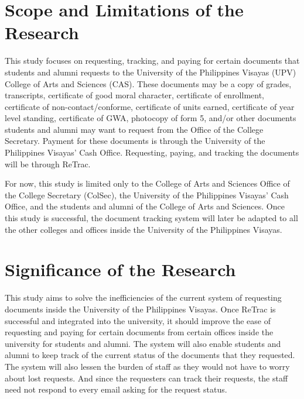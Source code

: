 \section{Scope and Limitations of the Research}
\label{sec:scopelimitations}

This study focuses on requesting, tracking, and paying for certain documents that students and alumni requests to the University of the Philippines Visayas (UPV) College of Arts and Sciences (CAS). These documents may be a copy of grades, transcripts, certificate of good moral character, certificate of enrollment, certificate of non-contact/conforme, certificate of units earned, certificate of year level standing, certificate of GWA, photocopy of form 5, and/or other documents students and alumni may want to request from the Office of the College Secretary. Payment for these documents is through the University of the Philippines Visayas’ Cash Office. Requesting, paying, and tracking the documents will be through ReTrac.

For now, this study is limited only to the College of Arts and Sciences Office of the College Secretary (ColSec), the University of the Philippines Visayas’ Cash Office, and the students and alumni of the College of Arts and Sciences. Once this study is successful, the document tracking system will later be adapted to all the other colleges and offices inside the University of the Philippines Visayas. 



\section{Significance of the Research}
\label{sec:significance}

This study aims to solve the inefficiencies of the current system of requesting documents inside the University of the Philippines Visayas. Once ReTrac is successful and integrated into the university, it should improve the ease of requesting and paying for certain documents from certain offices inside the university for students and alumni. The system will also enable students and alumni to keep track of the current status of the documents that they requested. The system will also lessen the burden of staff as they would not have to worry about lost requests. And since the requesters can track their requests, the staff need not respond to every email asking for the request status.


